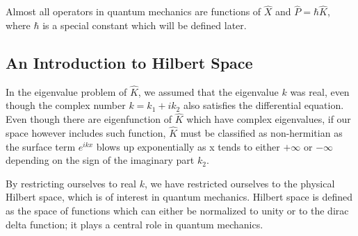 \documentclass[12pt,a4paper]{report}
\begin{document}
Almost all operators in quantum mechanics are functions of $\hat{X}$ and $\hat{P} = \hbar \hat{K}$, where $\hbar$ is a special constant which will be defined later.

\subsection{An Introduction to Hilbert Space}

In the eigenvalue problem of $\hat{K}$, we assumed that the eigenvalue $k$ was real, even though the complex number $k=k_1+ik_2$ also satisfies the differential equation. Even though there are eigenfunction of $\hat{K}$ which have complex eigenvalues, if our space however includes such function, $\hat{K}$ must be classified as non-hermitian as the surface term $e^{ikx}$ blows up exponentially as x tends to either $+\infty$ or $-\infty$ depending on the sign of the imaginary part $k_2$.

By restricting ourselves to real $k$, we have restricted ourselves to the physical Hilbert space, which is of interest in quantum mechanics. Hilbert space is defined as the space of functions which can either be normalized to unity or to the dirac delta function; it plays a central role in quantum mechanics.
\end{document}
